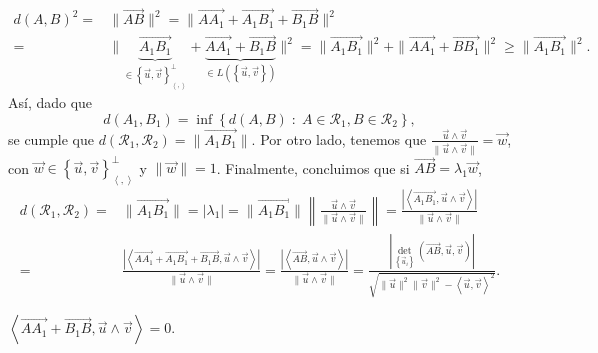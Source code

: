 \[
\begin{split}
	d\left(A,B\right)^{2} = & \|\overrightarrow{AB}\|^{2} = \|\overrightarrow{AA_{1}} + \overrightarrow{A_{1}B_{1}} + \overrightarrow{B_{1}B}\|^{2} 
	\\
	= &  \|\underbrace{\overrightarrow{A_{1}B_{1}}}_{\in \left\{ \vec{u}, \vec{v}\right\}^{\perp }_{\left\langle ,  \right\rangle }} + \underbrace{\overrightarrow{AA_{1}} + \overrightarrow{B_{1}B}}_{\in L\left( \left\{ \vec{u}, \vec{v}\right\} \right)}\|^{2} 
	=   \|\overrightarrow{A_{1}B_{1}}\|^{2} + \|\overrightarrow{AA_{1}}+\overrightarrow{BB_{1}}\|^{2} \geq \|\overrightarrow{A_{1}B_{1}}\|^{2}.
\end{split}
\]
Así, dado que 
\[d\left(A_{1}, B_{1}\right) = \inf \left\{ d\left(A,B\right) \; : \; A \in \mathcal{R}_{1}, B \in \mathcal{R}_{2}\right\}  ,\]
se cumple que $\displaystyle d\left(\mathcal{R}_{1}, \mathcal{R}_{2}\right) = \|\overrightarrow{A_{1}B_{1}}\| $. Por otro lado, tenemos que $\displaystyle \frac{\vec{u}\land \vec{v}}{\|\vec{u}\land\vec{v}\|} = \vec{w} $, con $\displaystyle \vec{w} \in \left\{ \vec{u}, \vec{v}\right\} ^{\perp }_{\left\langle ,  \right\rangle } $ y $\displaystyle \|\vec{w}\| = 1 $. Finalmente, concluimos que si $\displaystyle \overrightarrow{AB} = \lambda_{1}\vec{w} $,
\[
\begin{split}
	d\left(\mathcal{R}_{1}, \mathcal{R}_{2}\right) = & \|\overrightarrow{A_{1}B_{1}}\| = \left|\lambda_{1}\right| = \|\vec{A_{1}B_{1}}\| \left\|\frac{\vec{u}\land \vec{v}}{\|\vec{u}\land\vec{v}\|}\right\| 
= \frac{ \left|\left\langle \overrightarrow{A_{1}B_{1}}, \vec{u}\land\vec{v} \right\rangle \right|}{\|\vec{u}\land\vec{v}\|} \\
	= &  \frac{ \left|\left\langle \overrightarrow{AA_{1}} + \overrightarrow{A_{1}B_{1}} + \overrightarrow{B_{1}B}, \vec{u} \land \vec{v} \right\rangle \right|}{\|\vec{u}\land \vec{v}\|} = \frac{ \left|\left\langle \overrightarrow{AB}, \vec{u}\land \vec{v} \right\rangle \right|}{\|\vec{u}\land\vec{v}\|} = \frac{ \left|\det_{ \left\{ \vec{u}_{i}\right\}} \left(\overrightarrow{AB}, \vec{u}, \vec{v}\right)\right|}{\sqrt{\|\vec{u}\|^{2}\|\vec{v}\|^{2}-\left\langle \vec{u}, \vec{v} \right\rangle ^{2}}}.
\end{split}
\]
\begin{observation}
\normalfont $\displaystyle \left\langle \overrightarrow{AA_{1}}+\overrightarrow{B_{1}B}, \vec{u}\land \vec{v} \right\rangle = 0 $.
\end{observation}
